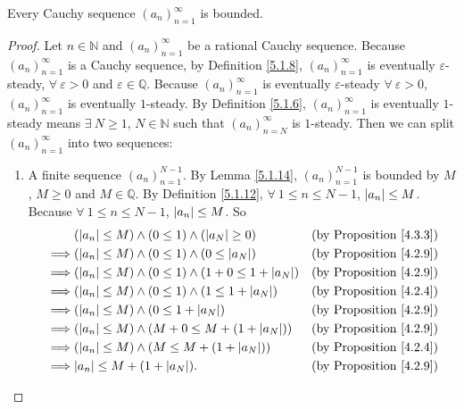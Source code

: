 \begin{lemma}\label{5.1.15}
Every Cauchy sequence \((a_n)_{n = 1}^{\infty}\) is bounded.
\end{lemma}

\begin{proof}
Let \(n \in \mathds{N}\) and \((a_n)_{n = 1}^{\infty}\) be a rational Cauchy sequence.
Because \((a_n)_{n = 1}^{\infty}\) is a Cauchy sequence, by Definition \ref{5.1.8}, \((a_n)_{n = 1}^{\infty}\) is eventually \(\varepsilon\)-steady, \(\forall\ \varepsilon > 0\) and \(\varepsilon \in \mathds{Q}\).
Because \((a_n)_{n = 1}^{\infty}\) is eventually \(\varepsilon\)-steady \(\forall\ \varepsilon > 0\), \((a_n)_{n = 1}^{\infty}\) is eventually \(1\)-steady.
By Definition \ref{5.1.6}, \((a_n)_{n = 1}^{\infty}\) is eventually \(1\)-steady means \(\exists\ N \geq 1\), \(N \in \mathds{N}\) such that \((a_n)_{n = N}^{\infty}\) is \(1\)-steady.
Then we can split \((a_n)_{n = 1}^{\infty}\) into two sequences:
\begin{enumerate}
    \item A finite sequence \((a_n)_{n = 1}^{N - 1}\).
    By Lemma \ref{5.1.14}, \((a_n)_{n = 1}^{N - 1}\) is bounded by \(M\), \(M \geq 0\) and \(M \in \mathds{Q}\).
    By Definition \ref{5.1.12}, \(\forall\ 1 \leq n \leq N - 1\), \(\abs*{a_n} \leq M\).
    Because \(\forall\ 1 \leq n \leq N - 1\), \(\abs*{a_n} \leq M\).
    So
    \begin{align*}
    & (\abs*{a_n} \leq M) \land (0 \leq 1) \land (\abs*{a_N} \geq 0) & \text{(by Proposition \ref{4.3.3})} \\
    \implies & (\abs*{a_n} \leq M) \land (0 \leq 1) \land (0 \leq \abs*{a_N}) & \text{(by Proposition \ref{4.2.9})} \\
    \implies & (\abs*{a_n} \leq M) \land (0 \leq 1) \land (1 + 0 \leq 1 + \abs*{a_N}) & \text{(by Proposition \ref{4.2.9})} \\
    \implies & (\abs*{a_n} \leq M) \land (0 \leq 1) \land (1 \leq 1 + \abs*{a_N}) & \text{(by Proposition \ref{4.2.4})} \\
    \implies & (\abs*{a_n} \leq M) \land (0 \leq 1 + \abs*{a_N}) & \text{(by Proposition \ref{4.2.9})} \\
    \implies & (\abs*{a_n} \leq M) \land (M + 0 \leq M + (1 + \abs*{a_N})) & \text{(by Proposition \ref{4.2.9})} \\
    \implies & (\abs*{a_n} \leq M) \land (M \leq M + (1 + \abs*{a_N})) & \text{(by Proposition \ref{4.2.4})} \\
    \implies & \abs*{a_n} \leq  M + (1 + \abs*{a_N}). & \text{(by Proposition \ref{4.2.9})}

\end{align*}
\end{enumerate}
\end{proof}
